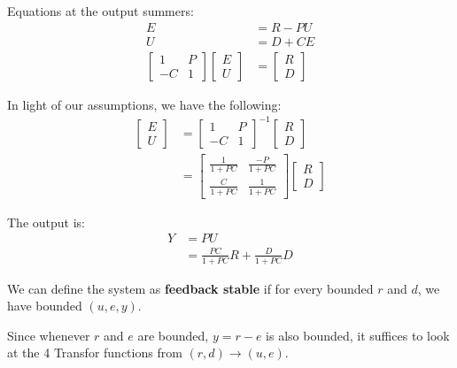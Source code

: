 \begin{enumerate}
            Equations at the output summers:
            \begin{align*}
                E &= R - PU \\
                U &= D + CE \\
                \begin{bmatrix} 1 & P \\ -C & 1  \end{bmatrix} \begin{bmatrix} E \\ U  \end{bmatrix} &= \begin{bmatrix} R \\ D  \end{bmatrix}
            \end{align*}

            In light of our assumptions, we have the following:
            \begin{align*}
                \begin{bmatrix} E \\ U  \end{bmatrix} &= {\begin{bmatrix} 1 & P \\ -C & 1  \end{bmatrix}}^{-1} \begin{bmatrix} R \\ D  \end{bmatrix} \\
                &= {\begin{bmatrix} \frac{1}{1+PC} & \frac{-P}{1+PC} \\ \frac{C}{1+PC} & \frac{1}{1+PC}  \end{bmatrix}} \begin{bmatrix} R \\ D  \end{bmatrix}
            \end{align*}

            The output is:
            \begin{align*}
                Y &= PU \\
                &= \frac{PC}{1+PC}R + \frac{D}{1 + PC}D
            \end{align*}

            We can define the system as {\bf feedback stable} if for every bounded $r$ and $d$, we have bounded $(u, e, y)$.

            Since whenever $r$ and $e$ are bounded, $y = r - e$ is also bounded, it suffices to look at the 4 Transfor functions from $(r, d) \to (u, e)$.


\end{enumerate}
